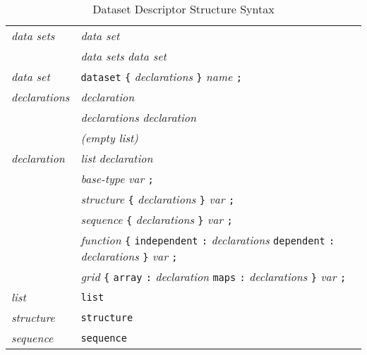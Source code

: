 \begin{table}
\caption{Dataset Descriptor Structure Syntax}
\label{tab:DDS}
\small
\begin{center}
\begin{tabular}{ll} \hline
%
%
{\em data sets\/} & {\em data set\/} \\
                 & {\em data sets} {\em data set\/} \\

{\em data set\/}  & {\tt dataset} {\tt \{} {\em declarations\/} {\tt \}} 
                   {\em  name\/} {\tt ;} \\

{\em declarations\/} & {\em declaration\/} \\
                 & {\em declarations} {\em  declaration\/} \\
		 & {\em (empty list)} \\

{\em declaration\/} &   {\em list} {\em declaration\/}  \\
                 & {\em base-type} {\em var\/} {\tt ;} \\
                 & {\em structure\/}  {\tt \{} {\em declarations\/} {\tt \}} 
                  {\em var\/} {\tt ;} \\
                 & {\em sequence\/} {\tt \{} {\em declarations\/} {\tt \}} 
                  {\em var\/} {\tt ;} \\
                 & {\em function\/} {\tt \{} {\tt independent} {\tt :}
                  {\em declarations} {\tt dependent\/} {\tt :} 
                  {\em declarations\/} {\tt \}} 
                  {\em var\/} {\tt ;} \\
                 & {\em grid\/} {\tt \{} {\tt array} {\tt :} 
                  {\em declaration\/} {\tt maps} {\tt :} 
                  {\em declarations\/} {\tt \}} 
                  {\em var\/} {\tt ;} \\

{\em list\/}    & {\tt list} \\

{\em structure\/} & {\tt structure} \\

{\em sequence\/} & {\tt sequence} \\


\end{tabular}
\end{center}
\end{table}
